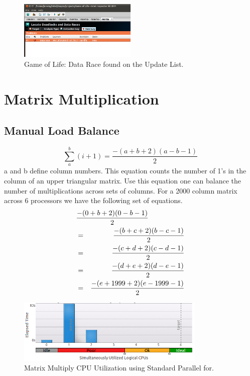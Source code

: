\documentclass[journal,10pt,onecolumn,draftcls]{IEEEtran}
\begin{document}
\begin{figure}[!t]
\begin{center}
\includegraphics[width=0.5\textwidth]{figures/Data_Race_Anaylsis.png}
\caption{Game of Life: Data Race found on the Update List.}
\label{fig:inspector_data_race_allocator}
\end{center}
\end{figure}

\section{Matrix Multiplication}


\subsection{Manual Load Balance}

\begin{equation}
\sum\limits_{a}^b (i + 1) = \frac{-(a + b + 2)(a - b -1)}{2}
\end{equation}
a and b define column numbers.  This equation counts the number of 1's in the 
column of an upper triangular matrix. Use this equation one can balance the number of 
multiplications across sets of columns.  For a 2000 column matrix across 6 processors 
we have the following set of equations.
\begin{eqnarray}
\lefteqn{\frac{-(0 + b + 2)(0 - b -1)}{2}} \\
& = & \frac{-(b + c + 2)(b - c -1)}{2} \\
& = & \frac{-(c + d + 2)(c - d -1)}{2} \\
& = & \frac{-(d + e + 2)(d - e -1)}{2} \\
& = & \frac{-(e + 1999 + 2)(e - 1999 -1)}{2}
\end{eqnarray}

\begin{figure}[!t]
\begin{center}
\includegraphics[width=0.8\textwidth]{figures/matrix_without_dynamic_schedule_cpu_usage.png}
\caption{Matrix Multiply CPU Utilization using Standard Parallel for.}
\label{fig:matrix_wo_dynamic_schedule_cpu_usage}
\end{center}
\end{figure}
\end{document}
